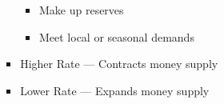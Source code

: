 \documentclass[12pt]{article}
\begin{document}
\begin{enumerate}
\begin{itemize}
\begin{itemize}
\begin{itemize}
\begin{itemize}
                  \item Make up reserves

                  \item Meet local or seasonal demands

                \end{itemize}

              \item Higher Rate — Contracts money supply

              \item Lower Rate — Expands money supply

            \end{itemize}

        \end{itemize}

    \end{itemize}

\end{enumerate}
\end{document}
